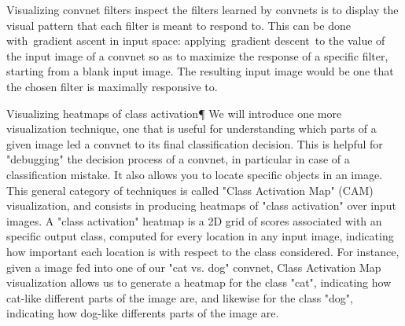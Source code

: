 Visualizing convnet filters
inspect the filters learned by convnets is to display the visual pattern that each filter is meant to respond to. This can be done with gradient ascent in input space: applying gradient descent to the value of the input image of a convnet so as to maximize the response of a specific filter, starting from a blank input image. The resulting input image would be one that the chosen filter is maximally responsive to.

Visualizing heatmaps of class activation¶
We will introduce one more visualization technique, one that is useful for understanding which parts of a given image led a convnet to its final classification decision. This is helpful for "debugging" the decision process of a convnet, in particular in case of a classification mistake. It also allows you to locate specific objects in an image.
This general category of techniques is called "Class Activation Map" (CAM) visualization, and consists in producing heatmaps of "class activation" over input images. A "class activation" heatmap is a 2D grid of scores associated with an specific output class, computed for every location in any input image, indicating how important each location is with respect to the class considered. For instance, given a image fed into one of our "cat vs. dog" convnet, Class Activation Map visualization allows us to generate a heatmap for the class "cat", indicating how cat-like different parts of the image are, and likewise for the class "dog", indicating how dog-like differents parts of the image are.
\fi

